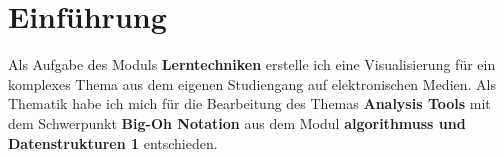 \section{Einführung}

Als Aufgabe des Moduls \textbf{Lerntechniken} erstelle ich eine Visualisierung für ein komplexes Thema aus dem eigenen Studiengang auf elektronischen Medien.
Als Thematik habe ich mich für die Bearbeitung des Themas \textbf{Analysis Tools} mit dem Schwerpunkt \textbf{Big-Oh Notation} aus dem Modul \textbf{\glspl{algorithmus} und Datenstrukturen 1} entschieden.